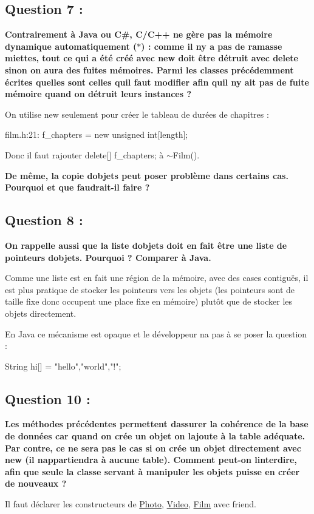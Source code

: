 \subsection*{Question 7 \+:}

{\bfseries Contrairement à Java ou C\#, C/\+C++ ne gère pas la mémoire dynamique automatiquement ($\ast$) \+: comme il n\textquotesingle{}y a pas de ramasse miettes, tout ce qui a été créé avec new doit être détruit avec delete sinon on aura des fuites mémoires. Parmi les classes précédemment écrites quelles sont celles qu\textquotesingle{}il faut modifier afin qu\textquotesingle{}il n\textquotesingle{}y ait pas de fuite mémoire quand on détruit leurs instances ?}

On utilise {\ttfamily new} seulement pour créer le tableau de durées de chapitres \+: \begin{DoxyVerb}film.h:21: f_chapters = new unsigned int[length];
\end{DoxyVerb}


Donc il faut rajouter {\ttfamily delete\mbox{[}\mbox{]} f\+\_\+chapters;} à {\ttfamily $\sim$\+Film()}.

{\bfseries De même, la copie d\textquotesingle{}objets peut poser problème dans certains cas. Pourquoi et que faudrait-\/il faire ?}

\subsection*{Question 8 \+:}

{\bfseries On rappelle aussi que la liste d\textquotesingle{}objets doit en fait être une liste de pointeurs d\textquotesingle{}objets. Pourquoi ? Comparer à Java.}

Comme une liste est en fait une région de la mémoire, avec des cases contiguës, il est plus pratique de stocker les pointeurs vers les objets (les pointeurs sont de taille fixe donc occupent une place fixe en mémoire) plutôt que de stocker les objets directement.

En Java ce mécanisme est opaque et le développeur n\textquotesingle{}a pas à se poser la question \+: \begin{DoxyVerb}String hi[] = {"hello","world","!"};
\end{DoxyVerb}


\subsection*{Question 10 \+:}

{\bfseries Les méthodes précédentes permettent d\textquotesingle{}assurer la cohérence de la base de données car quand on crée un objet on l\textquotesingle{}ajoute à la table adéquate. Par contre, ce ne sera pas le cas si on crée un objet directement avec new (il n\textquotesingle{}appartiendra à aucune table). Comment peut-\/on l\textquotesingle{}interdire, afin que seule la classe servant à manipuler les objets puisse en créer de nouveaux ?}

Il faut déclarer les constructeurs de \hyperlink{classPhoto}{Photo}, \hyperlink{classVideo}{Video}, \hyperlink{classFilm}{Film} avec friend. 
